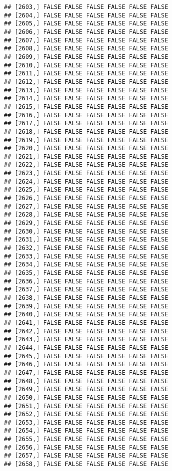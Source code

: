 \documentclass[
]{article}
\begin{document}
\begin{verbatim}
## [2603,] FALSE FALSE FALSE FALSE FALSE FALSE
## [2604,] FALSE FALSE FALSE FALSE FALSE FALSE
## [2605,] FALSE FALSE FALSE FALSE FALSE FALSE
## [2606,] FALSE FALSE FALSE FALSE FALSE FALSE
## [2607,] FALSE FALSE FALSE FALSE FALSE FALSE
## [2608,] FALSE FALSE FALSE FALSE FALSE FALSE
## [2609,] FALSE FALSE FALSE FALSE FALSE FALSE
## [2610,] FALSE FALSE FALSE FALSE FALSE FALSE
## [2611,] FALSE FALSE FALSE FALSE FALSE FALSE
## [2612,] FALSE FALSE FALSE FALSE FALSE FALSE
## [2613,] FALSE FALSE FALSE FALSE FALSE FALSE
## [2614,] FALSE FALSE FALSE FALSE FALSE FALSE
## [2615,] FALSE FALSE FALSE FALSE FALSE FALSE
## [2616,] FALSE FALSE FALSE FALSE FALSE FALSE
## [2617,] FALSE FALSE FALSE FALSE FALSE FALSE
## [2618,] FALSE FALSE FALSE FALSE FALSE FALSE
## [2619,] FALSE FALSE FALSE FALSE FALSE FALSE
## [2620,] FALSE FALSE FALSE FALSE FALSE FALSE
## [2621,] FALSE FALSE FALSE FALSE FALSE FALSE
## [2622,] FALSE FALSE FALSE FALSE FALSE FALSE
## [2623,] FALSE FALSE FALSE FALSE FALSE FALSE
## [2624,] FALSE FALSE FALSE FALSE FALSE FALSE
## [2625,] FALSE FALSE FALSE FALSE FALSE FALSE
## [2626,] FALSE FALSE FALSE FALSE FALSE FALSE
## [2627,] FALSE FALSE FALSE FALSE FALSE FALSE
## [2628,] FALSE FALSE FALSE FALSE FALSE FALSE
## [2629,] FALSE FALSE FALSE FALSE FALSE FALSE
## [2630,] FALSE FALSE FALSE FALSE FALSE FALSE
## [2631,] FALSE FALSE FALSE FALSE FALSE FALSE
## [2632,] FALSE FALSE FALSE FALSE FALSE FALSE
## [2633,] FALSE FALSE FALSE FALSE FALSE FALSE
## [2634,] FALSE FALSE FALSE FALSE FALSE FALSE
## [2635,] FALSE FALSE FALSE FALSE FALSE FALSE
## [2636,] FALSE FALSE FALSE FALSE FALSE FALSE
## [2637,] FALSE FALSE FALSE FALSE FALSE FALSE
## [2638,] FALSE FALSE FALSE FALSE FALSE FALSE
## [2639,] FALSE FALSE FALSE FALSE FALSE FALSE
## [2640,] FALSE FALSE FALSE FALSE FALSE FALSE
## [2641,] FALSE FALSE FALSE FALSE FALSE FALSE
## [2642,] FALSE FALSE FALSE FALSE FALSE FALSE
## [2643,] FALSE FALSE FALSE FALSE FALSE FALSE
## [2644,] FALSE FALSE FALSE FALSE FALSE FALSE
## [2645,] FALSE FALSE FALSE FALSE FALSE FALSE
## [2646,] FALSE FALSE FALSE FALSE FALSE FALSE
## [2647,] FALSE FALSE FALSE FALSE FALSE FALSE
## [2648,] FALSE FALSE FALSE FALSE FALSE FALSE
## [2649,] FALSE FALSE FALSE FALSE FALSE FALSE
## [2650,] FALSE FALSE FALSE FALSE FALSE FALSE
## [2651,] FALSE FALSE FALSE FALSE FALSE FALSE
## [2652,] FALSE FALSE FALSE FALSE FALSE FALSE
## [2653,] FALSE FALSE FALSE FALSE FALSE FALSE
## [2654,] FALSE FALSE FALSE FALSE FALSE FALSE
## [2655,] FALSE FALSE FALSE FALSE FALSE FALSE
## [2656,] FALSE FALSE FALSE FALSE FALSE FALSE
## [2657,] FALSE FALSE FALSE FALSE FALSE FALSE
## [2658,] FALSE FALSE FALSE FALSE FALSE FALSE

\end{verbatim}
\end{document}

